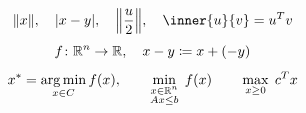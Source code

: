 \documentclass{article}
\begin{document}
\[ \norm{x}, \quad \abs{x - y}, \quad \norm*{\frac{u}{2}}, \quad \inner{u}{v} = u\tp v \]
\[ \map{f}{\R^n}{\R}, \quad x - y \defeq x + (-y) \]
\[ x^* = \argmin_{x \in C} f(x), \qquad \minimize{f(x)}{x \in \R^n \\ Ax \le b}
   \qquad \maximize{c\tp x}{x \ge 0} \]
\end{document}
